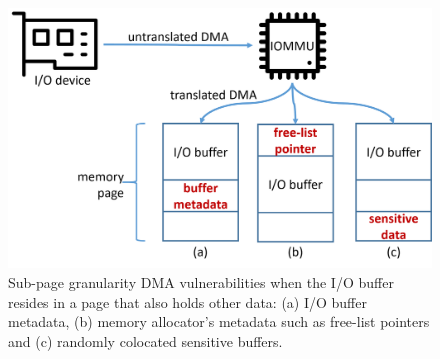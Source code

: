 \begin{figure}[t]
    \centering
    \includegraphics[width=1\columnwidth]{figs/colocation.png}
    \caption{Sub-page granularity DMA vulnerabilities when the I/O buffer resides in
a page that also holds other data: (a) I/O buffer metadata, (b) memory allocator’s
metadata such as free-list pointers and (c) randomly colocated sensitive buffers.}
    \label{fig:colocation}
\end{figure}
